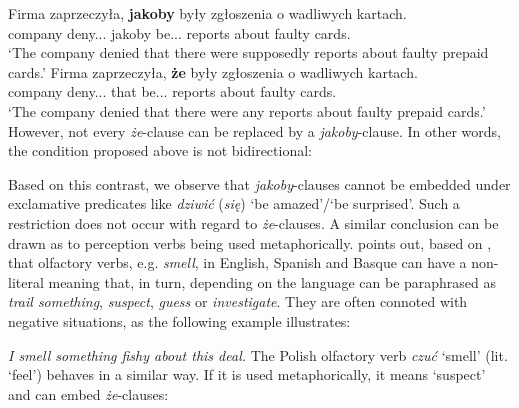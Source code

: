\documentclass[output=paper]{langsci/langscibook}
\begin{document}
\ea \ea \gll		Firma zaprzeczyła, \textbf{jakoby} były zgłoszenia o wadliwych kartach. \label{kaffeec} \\
			company deny.{\lptcp}.{\sg}.{\fem} jakoby be.{\lptcp}.{\nvir}.{\pl} reports about faulty cards.{\LOC} \\
	\glt	`The company denied that there were supposedly reports about faulty prepaid cards.'
	\ex\gll			Firma zaprzeczyła, \textbf{że} były zgłoszenia o wadliwych kartach. \\
			company deny.{\lptcp}.{\sg}.{\fem} that be.{\lptcp}.{\nvir}.{\pl} reports about faulty cards.{\LOC} \\
	\glt	`The company denied that there were any reports about faulty prepaid cards.'
\z\z
However, not every \emph{że}-clause can be replaced by a \emph{jakoby}-clause. In other words, the condition proposed above is not bidirectional:

\ea {}
\z\z
Based on this contrast, we observe that \emph{jakoby}-clauses cannot be embedded under exclamative predicates like \emph{dziwić} (\emph{się})  `be amazed'\slash `be surprised'. Such a restriction does not occur with regard to  \emph{że}-clauses. A similar conclusion can be drawn as to perception verbs being used metaphorically. \textcite{Ibarretxe-Antunano1999} points out, based on \textcite{Sweetser1990}, that olfactory verbs, e.g. \emph{smell}, in English, Spanish and Basque can have a non-literal meaning that, in turn, depending on the language can be paraphrased as \emph{trail something}, \emph{suspect}, \emph{guess} or \emph{investigate}. They are often connoted with negative situations, as the following example illustrates:

\ea \textit{I smell something fishy about this deal.}  \z
The Polish olfactory verb \emph{czuć} `smell' (lit. `feel') behaves in a similar way. If it is used metaphorically, it means `suspect' and can embed \emph{że}-clauses:
\end{document}
